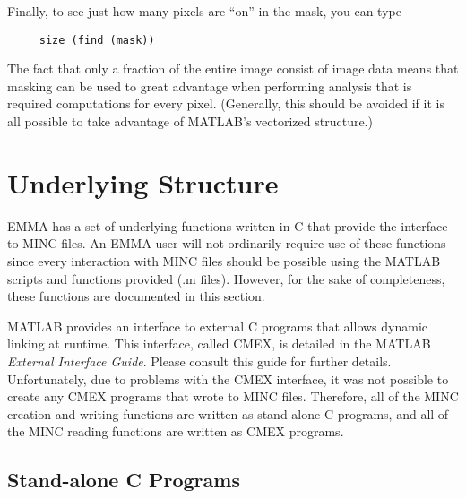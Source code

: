 Finally, to see just how many pixels are ``on'' in the mask, you can type
\begin{verbatim}
     size (find (mask))
\end{verbatim}
The fact that only a fraction of the entire image consist of image
data means that masking can be used to great advantage when performing
analysis that is required computations for every pixel.  (Generally,
this should be avoided if it is all possible to take advantage of
MATLAB's vectorized structure.)

\newpage
\section{Underlying Structure}

EMMA has a set of underlying functions written in C that provide the
interface to MINC files.  An EMMA user will not ordinarily require use
of these functions since every interaction with MINC files should be
possible using the MATLAB scripts and functions provided (.m files).
However, for the sake of completeness, these functions are documented
in this section.

MATLAB provides an interface to external C programs that allows
dynamic linking at runtime.  This interface, called CMEX, is detailed
in the MATLAB {\em External Interface Guide}.  Please consult this
guide for further details.  Unfortunately, due to problems with the
CMEX interface, it was not possible to create any CMEX programs that
wrote to MINC files.  Therefore, all of the MINC creation and writing
functions are written as stand-alone C programs, and all of the MINC
reading functions are written as CMEX programs.


\subsection {Stand-alone C Programs}

